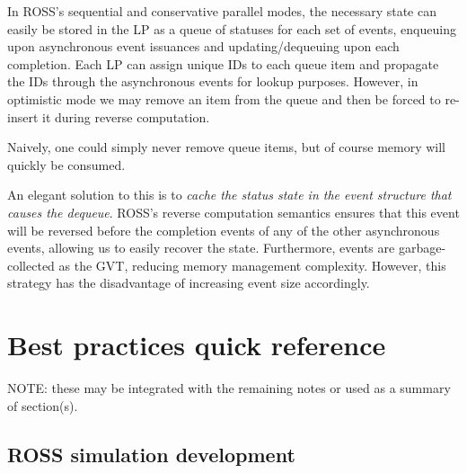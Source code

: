 \documentclass[conference,10pt,compsocconf,onecolumn]{IEEEtran}
\begin{document}
In ROSS's sequential and conservative parallel modes, the necessary state can
easily be stored in the LP as a queue of statuses for each set of events,
enqueuing upon asynchronous event issuances and updating/dequeuing upon each
completion. Each LP can assign unique IDs to each queue item and propagate the
IDs through the asynchronous events for lookup purposes. However, in optimistic
mode we may remove an item from the queue and then be forced to re-insert it
during reverse computation.

Naively, one could simply never remove queue items, but of course memory will
quickly be consumed.

An elegant solution to this is to \emph{cache the status state in the event
structure that causes the dequeue}. ROSS's reverse computation semantics ensures
that this event will be reversed before the completion events of any of the
other asynchronous events, allowing us to easily recover the state. Furthermore,
events are garbage-collected as the GVT, reducing memory management complexity.
However, this strategy has the disadvantage of increasing event size
accordingly.

\section{Best practices quick reference}

NOTE: these may be integrated with the remaining notes or used as a summary of
section(s).

\subsection{ROSS simulation development}
\end{document}
